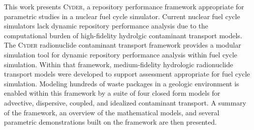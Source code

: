 This work presents \textsc{Cyder}, a repository performance framework 
appropriate for parametric studies in a nuclear fuel cycle simulator.  Current 
nuclear fuel cycle simulators lack dynamic repository performance analysis due 
to the computational burden of high-fidelity hydrolgic contaminant transport 
models.  The \textsc{Cyder} radionuclide contaminant transport framework 
provides a modular simulation tool for dynamic repository performance analysis 
within fuel cycle simulation.  Within that framework, medium-fidelity 
hydrologic radionuclide transport models were developed to support assessment 
appropriate for fuel cycle simulation.  Modeling hundreds of waste packages in 
a geologic environment is enabled within this framework by a suite of four 
closed form models for advective, dispersive, coupled, and idealized 
contaminant transport.  A summary of the framework, an overview of the 
mathematical models, and several parametric demonstrations built on the 
framework are then presented.

